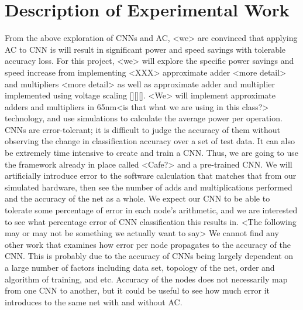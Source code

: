 \documentclass[conference]{IEEEtran}
\begin{document}

\section{Description of Experimental Work}
From the above exploration of CNNs and AC, <we> are convinced that applying AC to CNN is will result in significant power and speed savings with tolerable accuracy loss. For this project, <we> will explore the specific power savings and speed increase from implementing <XXX> approximate adder <more detail> and multipliers <more detail> as well as approximate adder and multiplier implemented using voltage scaling [][][]. 
<We> will implement approximate adders and multipliers in 65nm<is that what we are using in this class?> technology, and use simulations to calculate the average power per operation.
CNNs are error-tolerant; it is difficult to judge the accuracy of them without observing the change in classification accuracy over a set of test data. It can also be extremely time intensive to create and train a CNN. Thus, we are going to use the framework already in place called <Cafe?> and a pre-trained CNN. We will artificially introduce error to the software calculation that matches that from our simulated hardware, then see the number of adds and multiplications performed and the accuracy of the net as a whole.
We expect our CNN to be able to tolerate some percentage of error in each node's arithmetic, and we are interested to see what percentage error of CNN classification this results in. <The following may or may not be something we actually want to say> We cannot find any other work that examines how error per node propagates to the accuracy of the CNN. This is probably due to the accuracy of CNNs being largely dependent on a large number of factors including data set, topology of the net, order and algorithm of training, and etc. Accuracy of the nodes does not necessarily map from one CNN to another, but it could be useful to see how much error it introduces to the same net with and without AC.
\end{document}
